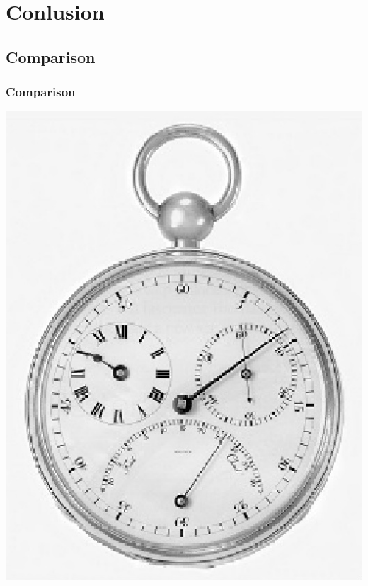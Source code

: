 \documentclass[notheorems,serif,table,compress]{beamer}  %
\begin{document}
\section{Conlusion}

\subsection{Comparison}

\begin{frame}
\frametitle{Comparison}
	\begin{minipage}[t]{0.32\linewidth}
        \centering
        \includegraphics[width=0.9\linewidth]{nearest.jpg} 
        \end{minipage}
	\begin{minipage}[t]{0.32\linewidth}
        \centering

\end{minipage}
\end{frame}
\end{document}
